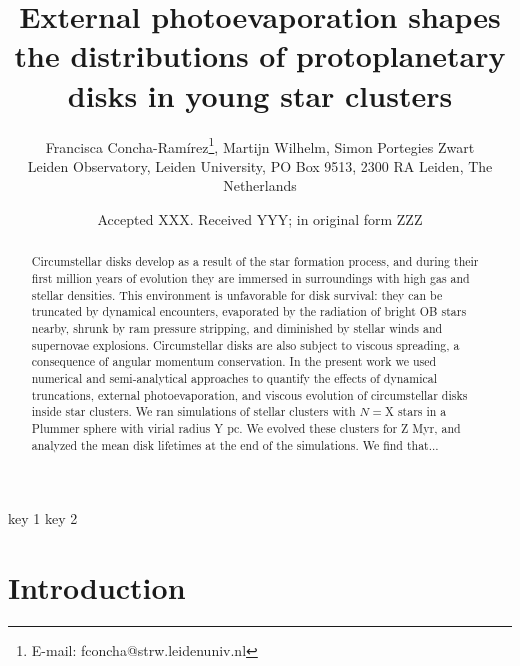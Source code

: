 \documentclass[fleqn,usenatbib]{mnras}
\title[External photoevaporation of disks in young star clusters]{External photoevaporation shapes the distributions of protoplanetary disks in young star clusters}
\author[Concha-Ramírez et al.]{
Francisca Concha-Ramírez\thanks{E-mail: fconcha@strw.leidenuniv.nl},
Martijn Wilhelm,
Simon Portegies Zwart
\\
Leiden Observatory, Leiden University, PO Box 9513, 2300 RA Leiden, The Netherlands\\
}
\date{Accepted XXX. Received YYY; in original form ZZZ}
\newcommand\note[1]{{\colorbox{yellow!60}{\color{magenta}#1}}}
\begin{document}
\label{firstpage}
\pagerange{\pageref{firstpage}--\pageref{lastpage}}
\maketitle

\begin{abstract}
Circumstellar disks develop as a result of the star formation process, and during their first million years of evolution they are immersed in surroundings with high gas and stellar densities. This environment is unfavorable for disk survival: they can be truncated by dynamical encounters, evaporated by the radiation of bright OB stars nearby, shrunk by ram pressure stripping, and diminished by stellar winds and supernovae explosions. Circumstellar disks are also subject to viscous spreading, a consequence of angular momentum conservation. In the present work we used numerical and semi-analytical approaches to quantify the effects of dynamical truncations, external photoevaporation, and viscous evolution of circumstellar disks inside star clusters. We ran simulations of stellar clusters with $N=$\note{X} stars in a Plummer sphere with virial radius \note{Y pc}. We evolved these clusters for \note{Z} Myr, and analyzed the mean disk lifetimes at the end of the simulations. \note{We find that...}
\end{abstract}

\begin{keywords}
key 1 key 2
\end{keywords}

\section{Introduction}
\label{sec:introduction}
\end{document}
